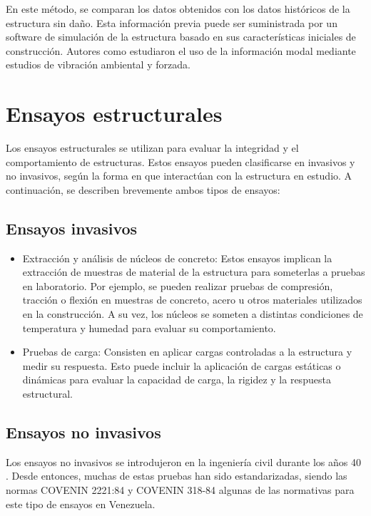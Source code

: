     En este método, se comparan los datos obtenidos con los datos históricos de la estructura sin daño. Esta información previa puede ser suministrada por un software de simulación de la estructura basado en sus características iniciales de construcción. Autores como \cite{fritzen2005vibration} estudiaron el uso de la información modal mediante estudios de vibración ambiental y forzada.

\section{Ensayos estructurales}

Los ensayos estructurales se utilizan para evaluar la integridad y el comportamiento de estructuras. Estos ensayos pueden clasificarse en invasivos y no invasivos, según la forma en que interactúan con la estructura en estudio. A continuación, se describen brevemente ambos tipos de ensayos:

\subsection{Ensayos invasivos}

\begin{itemize}
    \item{Extracción y análisis de núcleos de concreto:} Estos ensayos implican la extracción de muestras de material de la estructura para someterlas a pruebas en laboratorio. Por ejemplo, se pueden realizar pruebas de compresión, tracción o flexión en muestras de concreto, acero u otros materiales utilizados en la construcción. A su vez, los núcleos se someten a distintas condiciones de temperatura y humedad para evaluar su comportamiento.
    \item{Pruebas de carga:} Consisten en aplicar cargas controladas a la estructura y medir su respuesta. Esto puede incluir la aplicación de cargas estáticas o dinámicas para evaluar la capacidad de carga, la rigidez y la respuesta estructural.

\end{itemize}
   
\subsection{Ensayos no invasivos} 

Los ensayos no invasivos se introdujeron en la ingeniería civil durante los años 40 \citep{mohamed2014}. Desde entonces, muchas de estas pruebas han sido estandarizadas, siendo las normas COVENIN 2221:84 y COVENIN 318-84 algunas de las normativas para este tipo de ensayos en Venezuela. 

